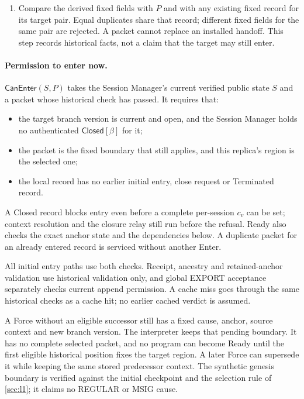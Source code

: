 \documentclass[11pt,a4paper]{article}
\newcommand{\tagg}[1]{\ensuremath{\mathsf{#1}}}
\begin{document}
\begin{enumerate}[label=(\roman*),itemsep=2pt]
to the maximum of the anchor's L1 reference height and the initial
authority's publication height. Validate the anchor's original direct or
covering commitment evidence under \cref{sec:coverage,sec:receipt-kernel},
together with its complete block and required ancestry. Do not relabel
it with the target pair.
\item Compare the derived fixed fields with $P$ and with any existing
fixed record for its target pair. Equal duplicates share that record;
different fixed fields for the same pair are rejected. A packet cannot
replace an installed handoff. This step records historical facts, not a
claim that the target may still enter.
\end{enumerate}

\paragraph{Permission to enter now.}
\label{sec:can-enter}
$\tagg{CanEnter}(S,P)$ takes the Session Manager's current verified
public state $S$ and a packet whose historical check has passed. It
requires that:
\begin{itemize}
\item the target branch version is current and open, and the Session
Manager holds no authenticated $\tagg{Closed}[\beta]$ for it;
\item the packet is the fixed boundary that still applies, and this
replica's region is the selected one;
\item the local record has no earlier initial entry, close request or
Terminated record.
\end{itemize}
A Closed record blocks entry even before a complete per-session $c_v$ can
be set; context resolution and the closure relay still run before the
refusal. Ready also checks the exact anchor state and the dependencies
below. A duplicate packet for an already entered record is serviced
without another Enter.

All initial entry paths use both checks. Receipt, ancestry and
retained-anchor validation use historical validation only, and global
EXPORT acceptance separately checks current append permission. A cache
miss goes through the same historical checks as a cache hit; no earlier
cached verdict is assumed.

A Force without an eligible successor still has a fixed cause, anchor,
source context and new branch version. The interpreter keeps that
pending boundary. It has no complete selected packet, and no program can
become Ready until the first eligible historical position fixes the
target region. A later Force can supersede it while keeping the same
stored predecessor context. The synthetic genesis boundary is verified
against the initial checkpoint and the selection rule of \cref{sec:l1};
it claims no REGULAR or MSIG cause.
\end{document}
